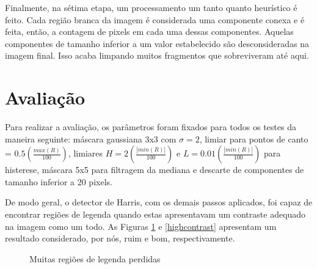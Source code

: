 \documentclass[12pt]{article}
\begin{document}
Finalmente,  na  sétima  etapa,   um  processamento  um  tanto  quanto
heurístico é  feito.  Cada região  branca da imagem é  considerada uma
componente conexa e  é feita, então, a contagem de  pixels em cada uma
dessas  componentes.  Aquelas  componentes  de tamanho  inferior a  um
valor estabelecido  são desconsideradas  na imagem final.   Isso acaba
limpando muitos fragmentos que sobreviveram até aqui.

\section{Avaliação}

Para realizar a  avaliação, os parâmetros foram fixados  para todos os
testes da  maneira seguinte: máscara  gaussiana 3x3 com $\sigma  = 2$,
limiar para pontos de  canto = $0.5 (\frac{max(R)}{100})$, limiares $H
= 2  (\frac{|min(R)|}{100})$ e $L =  0.01 (\frac{|min(R)|}{100})$ para
histerese,  máscara  5x5  para  filtragem  da mediana  e  descarte  de
componentes de tamanho inferior a 20 pixels.

De modo geral,  o detector de Harris, com  os demais passos aplicados,
foi capaz de encontrar regiões de legenda quando estas apresentavam um
contraste   adequado   na   imagem   como   um   todo.    As   Figuras
\ref{lowcontrast}   e  \ref{highcontrast}   apresentam   um  resultado
considerado, por nós, ruim e bom, respectivamente.

\begin{figure}[h!]
  \centering
  \quad
  \caption{Muitas regiões de legenda perdidas\label{lowcontrast}}
\end{figure}
\end{document}
